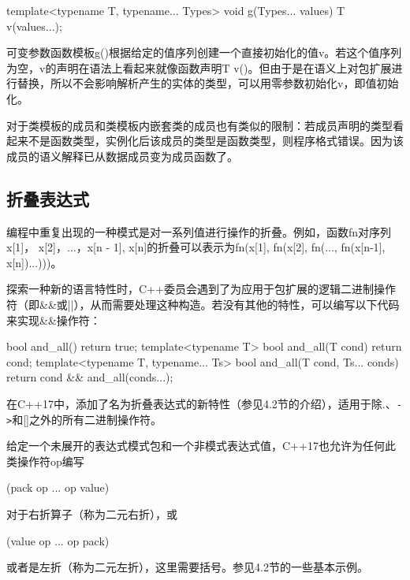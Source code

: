 \begin{cpp}
template<typename T, typename... Types>
void g(Types... values) {
	T v(values...);
}
\end{cpp}

可变参数函数模板g()根据给定的值序列创建一个直接初始化的值v。若这个值序列为空，v的声明在语法上看起来就像函数声明T v()。但由于是在语义上对包扩展进行替换，所以不会影响解析产生的实体的类型，可以用零参数初始化v，即值初始化。

\begin{notice}
对于类模板的成员和类模板内嵌套类的成员也有类似的限制：若成员声明的类型看起来不是函数类型，实例化后该成员的类型是函数类型，则程序格式错误。因为该成员的语义解释已从数据成员变为成员函数了。
\end{notice}

\subsection{折叠表达式}

编程中重复出现的一种模式是对一系列值进行操作的折叠。例如，函数fn对序列x[1]， x[2]，...，x[n - 1], x[n]的折叠可以表示为fn(x[1], fn(x[2], fn(..., fn(x[n-1], x[n])...)))。

探索一种新的语言特性时，C++委员会遇到了为应用于包扩展的逻辑二进制操作符（即\&\&或||），从而需要处理这种构造。若没有其他的特性，可以编写以下代码来实现\&\&操作符：

\begin{cpp}
bool and_all() { return true; }
template<typename T>
	bool and_all(T cond) { return cond; }
template<typename T, typename... Ts>
	bool and_all(T cond, Ts... conds) {
		return cond && and_all(conds...);
	}
\end{cpp}

在C++17中，添加了名为折叠表达式的新特性（参见4.2节的介绍），适用于除.、\texttt{->}和[]之外的所有二进制操作符。

给定一个未展开的表达式模式包和一个非模式表达式值，C++17也允许为任何此类操作符op编写

\begin{cpp}
(pack op ... op value)
\end{cpp}

对于右折算子（称为二元右折），或

\begin{cpp}
(value op ... op pack)
\end{cpp}

或者是左折（称为二元左折），这里需要括号。参见4.2节的一些基本示例。

